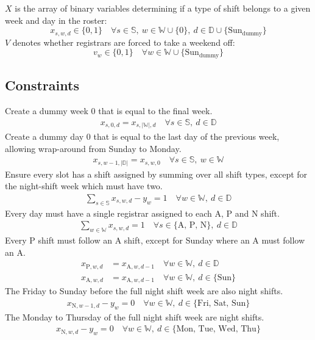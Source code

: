 \documentclass[a4paper]{article}
\begin{document}
$X$ is the array of binary variables determining if a type of shift belongs to a given week and day in the roster:
$$x_{s, w, d} \in \{0, 1\} \quad\forall s\in \mathbb{S},\  w\in \mathbb{W} \cup \{0\},\ d\in \mathbb{D} \cup \{\text{Sun}_\text{dummy}\}$$
$V$ denotes whether registrars are forced to take a weekend off:
$$v_w \in \{0, 1\} \quad\forall w\in \mathbb{W} \cup \{\text{Sun}_\text{dummy}\}$$

\subsection{Constraints}

Create a dummy week 0 that is equal to the final week.
\begin{align}
  x_{s, 0, d} = x_{s, |\mathbb{W}|, d} \quad\forall s\in \mathbb{S},\ d\in \mathbb{D}
\end{align}
Create a dummy day 0 that is equal to the last day of the previous week, allowing wrap-around from Sunday to Monday.
\begin{align}
  x_{s, w-1, |\mathbb{D}|} = x_{s, w, 0} \quad\forall s\in \mathbb{S},\ w\in \mathbb{W}
\end{align}
Ensure every slot has a shift assigned by summing over all shift types, except for the night-shift week which must have two.
\begin{align}
  \sum_{s\in \mathbb{S}} x_{s, w, d} - y_w = 1 \quad\forall w\in \mathbb{W},\ d\in \mathbb{D}
\end{align}
Every day must have a single registrar assigned to each A, P and N shift.
\begin{align}
  \sum_{w\in \mathbb{W}} x_{s, w, d} = 1 \quad\forall s\in \{\text{A, P, N}\},\ d\in \mathbb{D}
\end{align}
Every P shift must follow an A shift, except for Sunday where an A must follow an A.
\begin{align}
  x_{\text{P}, w, d} &= x_{\text{A}, w, d-1} \quad\forall w\in \mathbb{W},\ d\in \mathbb{D}\\
  x_{\text{A}, w, d} &= x_{\text{A}, w, d-1} \quad\forall w\in \mathbb{W},\ d\in \{\text{Sun}\}
\end{align}
The Friday to Sunday before the full night shift week are also night shifts.
\begin{align}
  x_{\text{N}, w-1, d} - y_w = 0 \quad\forall w\in \mathbb{W},\ d\in \{\text{Fri, Sat, Sun}\}
\end{align}
The Monday to Thursday of the full night shift week are night shifts.
\begin{align}
  x_{\text{N}, w, d} - y_w = 0 \quad\forall w\in \mathbb{W},\ d\in \{\text{Mon, Tue, Wed, Thu}\}
\end{align}
\end{document}
